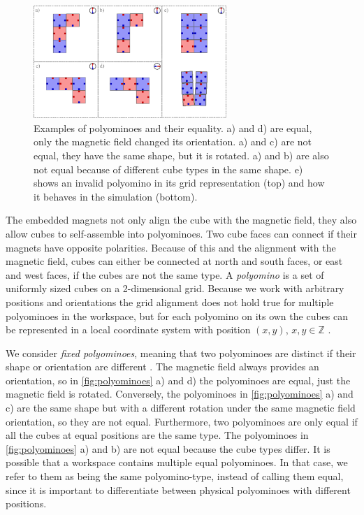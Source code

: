 \begin{figure}
	\centering
	\includegraphics[width=0.65\textwidth]{figures/polyominoes.pdf}
	\caption[Examples of Polyominoes and their equality]{Examples of polyominoes and their equality. a) and d) are equal, only the magnetic field changed its orientation. a) and c) are not equal, they have the same shape, but it is rotated. a) and b) are also not equal because of different cube types in the same shape. e) shows an invalid polyomino in its grid representation (top) and how it behaves in the simulation (bottom).}
	\label{fig:polyominoes}
\end{figure}

The embedded magnets not only align the cube with the magnetic field, they also allow cubes to self-assemble into polyominoes.
Two cube faces can connect if their magnets have opposite polarities.
Because of this and the alignment with the magnetic field, cubes can either be connected at north and south faces, or east and west faces, if the cubes are not the same type.
A \textit{polyomino} is a set of uniformly sized cubes on a 2-dimensional grid.
Because we work with arbitrary positions and orientations the grid alignment does not hold true for multiple polyominoes in the workspace, but for each polyomino on its own the cubes can be represented in a local coordinate system with position $(x,y)$, $x,y \in \mathbb{Z}$ \cite{Lu2021}.

We consider \textit{fixed polyominoes}, meaning that two polyominoes are distinct if their shape or orientation are different \cite{Lu2021}.
The magnetic field always provides an orientation, so in \autoref{fig:polyominoes} a) and d) the polyominoes are equal, just the magnetic field is rotated.
Conversely, the polyominoes in \autoref{fig:polyominoes} a) and c) are the same shape but with a different rotation under the same magnetic field orientation, so they are not equal.
Furthermore, two polyominoes are only equal if all the cubes at equal positions are the same type.
The polyominoes in \autoref{fig:polyominoes} a) and b) are not equal because the cube types differ.
It is possible that a workspace contains multiple equal polyominoes.
In that case, we refer to them as being the same polyomino-type, instead of calling them equal, since it is important to differentiate between physical polyominoes with different positions.

